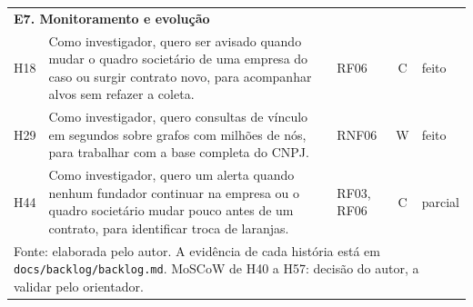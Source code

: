 \begin{small}
\begin{longtable}{lp{7.9cm}p{1.3cm}cp{1.9cm}}
\multicolumn{5}{l}{\textbf{E7. Monitoramento e evolução}} \\
H18 & Como investigador, quero ser avisado quando mudar o quadro societário de uma empresa do caso ou surgir contrato novo, para acompanhar alvos sem refazer a coleta. & RF06 & C & feito \\
H29 & Como investigador, quero consultas de vínculo em segundos sobre grafos com milhões de nós, para trabalhar com a base completa do CNPJ. & RNF06 & W & feito \\
H44 & Como investigador, quero um alerta quando nenhum fundador continuar na empresa ou o quadro societário mudar pouco antes de um contrato, para identificar troca de laranjas. & RF03, RF06 & C & parcial \\
\hline
\multicolumn{5}{p{14cm}}{\footnotesize Fonte: elaborada pelo autor. A evidência de cada história está em \texttt{docs/backlog/backlog.md}. MoSCoW de H40 a H57: decisão do autor, a validar pelo orientador.}\\
\end{longtable}
\end{small}
